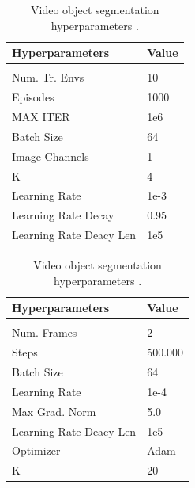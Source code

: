 \begin{table}[htbp]
    \begin{minipage}{.48\linewidth}
    \centering
        \begin{tabular}{ll}
            \multicolumn{1}{l}{\bf Hyperparameters}  &\multicolumn{1}{l}{\bf Value}
            \\ \hline \\
            Num. Tr. Envs & 10 \\ 
            Episodes & 1000 \\
            MAX ITER & 1e6 \\
            Batch Size & 64 \\
            Image Channels & 1 \\
            K & 4 \\
            Learning Rate  & 1e-3 \\
            Learning Rate Decay & 0.95 \\
            Learning Rate Deacy Len & 1e5 \\
            
        \end{tabular}
        \caption{Object keypoints hyperparameters \citep{kulkarni2019unsupervised}.} \label{tab:obj_keypoints_hyperparams}
    \end{minipage}%
    \hfill
    \begin{minipage}{.48\linewidth}
        \centering
        \begin{tabular}{ll}
            \multicolumn{1}{l}{\bf Hyperparameters}  &\multicolumn{1}{l}{\bf Value}
            \\ \hline \\
            Num. Frames & 2 \\ 
            Steps & 500.000 \\
            Batch Size & 64 \\
            Learning Rate  & 1e-4 \\
            Max Grad. Norm & 5.0 \\
            Learning Rate Deacy Len & 1e5 \\
            Optimizer & Adam \\
            K & 20 \\
        \end{tabular}
        \caption{Video object segmentation hyperparameters \citep{goel2018unsupervised}.} \label{tab:vid_seg_hp}
    \end{minipage}
\end{table}

